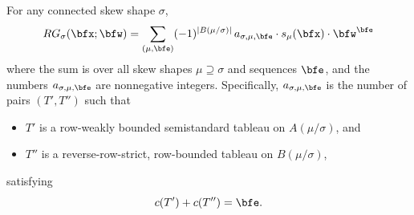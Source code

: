 \begin{theorem}\label{t:refinedcount} For any connected skew shape $\sigma$, 
\[
RG_\sigma(\bfx;\bfw) = \sum_{(\mu,\bfe)} (-1)^{| B(\mu/\sigma)|} \,a_{\sigma,\mu,\bfe} \cdot s_\mu(\bfx) \cdot\bfw^\bfe 
\]
where the sum is over all skew shapes $\mu\supseteq \sigma$ and sequences $\bfe$, and the numbers $a_{\sigma,\mu,\bfe}$ are nonnegative integers. Specifically, $a_{\sigma,\mu,\bfe}$ is the number of pairs $(T',T'')$ such that
\begin{itemize}
\item $T'$ is a row-weakly bounded semistandard tableau on $A(\mu/\sigma)$, and
\item $T''$ is a reverse-row-strict, row-bounded tableau on $B(\mu/\sigma)$, 
\end{itemize}
satisfying 
\[
c(T') + c(T'') = \bfe.
\]
\end{theorem}
